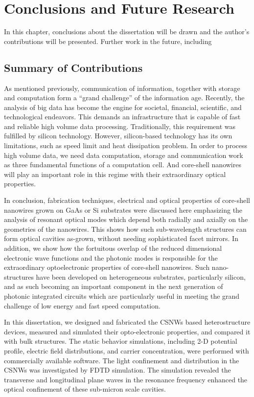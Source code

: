 \chapter{Conclusions and Future Research} \label{conclusions}

In this chapter, conclusions about the dissertation will be drawn and the
author's contributions will be presented. Further work in the future, including 

\section{Summary of Contributions}

As mentioned previously, communication of information, together with storage
and computation form a “grand challenge” of the information age.  Recently, the
analysis of big data has become the engine for societal, financial, scientific,
and technological endeavors. This demands an infrastructure that is capable of
fast and reliable high volume data processing. Traditionally, this requirement
was fulfilled by silicon technology. However, silicon-based technology has its
own limitations, such as speed limit and heat dissipation problem. In order to
process high volume data, we need data computation, storage and communication
work as three fundamental functions of a computation cell. And core-shell
nanowires will play an important role in this regime with their extraordinary
optical properties.

In conclusion, fabrication techniques, electrical and optical properties of
core-shell nanowires grown on GaAs or Si substrates were discussed here
emphasizing the analysis of resonant optical modes which depend both radially
and axially on the geometries of the nanowires. This shows how such
sub-wavelength structures can form optical cavities as-grown, without needing
sophisticated facet mirrors. In addition, we show how the fortuitous overlap of
the reduced dimensional electronic wave functions and the photonic modes is
responsible for the extraordinary optoelectronic properties of core-shell
nanowires. Such nano-structures have been developed on heterogeneous
substrates, particularly silicon, and as such becoming an important component
in the next generation of photonic integrated circuits which are particularly
useful in meeting the grand challenge of low energy and fast speed computation.


In this dissertation, we designed and fabricated the CSNWs based
heterostructure devices, measured and simulated their opto-electronic
properties, and compared it with bulk structures. The static behavior
simulations, including 2-D potential profile, electric field distributions, and
carrier concentration, were performed with commercially available software. The
light confinement and  distribution in the CSNWs was investigated by FDTD
simulation. The simulation revealed the transverse and longitudinal plane waves
in the resonance frequency enhanced the optical confinement of these sub-micron
scale cavities.

